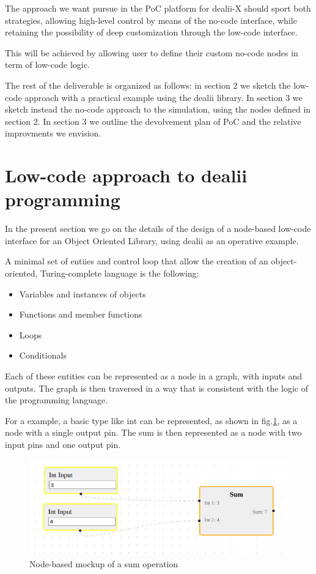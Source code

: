 \documentclass[a4paper,12pt]{article}
\begin{document}
The approach we want pursue in the PoC platform for dealii-X should sport both strategies, allowing high-level control by means of the no-code interface, while retaining the possibility of deep customization through the low-code interface. 

This will be achieved by allowing user to define their custom no-code nodes in term of low-code logic.

The rest of the deliverable is organized as follows: in section 2 we sketch the low-code approach with a practical example using the dealii library. In section 3 we sketch instead the no-code approach to the simulation, using the nodes defined in section 2. In section 3 we outline the devolvement plan of PoC and the relative improvments we envision. 


\section{\textcolor{EUblue}{Low-code approach to dealii programming}}

In the present section we go on the details of the design of a node-based low-code interface for an Object Oriented Library, using dealii as an operative example.

A minimal set of entiies and control loop that allow the creation of an object-oriented, Turing-complete language is the following:
\begin{itemize}
\item Variables and instances of objects
\item Functions and member functions
\item Loops
\item Conditionals
\end{itemize}

Each of these entities can be represented as a node in a graph, with inputs and outputs. The graph is then traversed in a way that is consistent with the logic of the programming language.

For a example, a basic type like int can be represented, as shown in fig.\ref{sum}, as a node with a single output pin. The sum is then represented as a node with two input pins and one output pin. 

\begin{figure}
    \label{sum}
    \includegraphics[width=400pt]{sum.png}
    \caption{Node-based mockup of a sum operation}
\end{figure}
\end{document}
